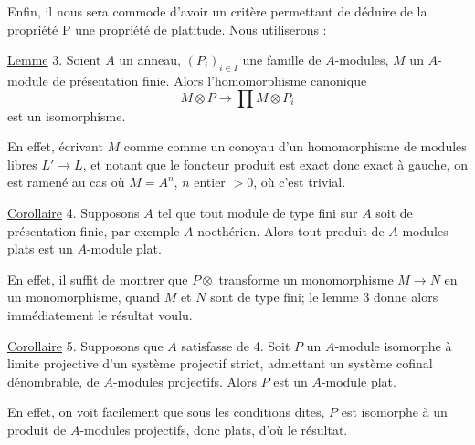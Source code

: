 
Enfin, il nous sera commode d'avoir un critère permettant de déduire
de la propriété P une propriété de platitude. Nous utiliserons :

\uline{Lemme} 3. Soient $A$ un anneau, $(P_i)_{i\in I}$ une famille de $A$-modules,
 $M$ un $A$-module de présentation finie. Alors l'homomorphisme canonique
\[
M\otimes P\longrightarrow\prod M\otimes P_i
\]
est un isomorphisme.

En effet, écrivant $M$ comme comme un conoyau d'un homomorphisme
de modules libres  $L'\longrightarrow L$, et notant que le foncteur produit est exact
donc exact à gauche, on est ramené au cas où $M=A^n$, $n$ entier $>0$, où
c'est trivial.

\uline{Corollaire} 4. Supposons $A$ tel que tout module de type fini sur $A$ soit
de présentation finie, par exemple $A$ noethérien. Alors tout produit de
$A$-modules plats est un $A$-module plat.

En effet, il suffit de montrer que $P\otimes$ transforme un monomorphisme
$M\longrightarrow N$ en un monomorphisme, quand $M$ et $N$ sont de type fini; le lemme 3 donne
alors immédiatement le résultat voulu.

\uline{Corollaire} 5. Supposons que $A$ satisfasse 
 de 4.  Soit
$P$ un $A$-module  isomorphe à  limite projective
d'un système projectif strict, 
admettant un système cofinal dénombrable, de $A$-modules projectifs. Alors
$P$ est un $A$-module plat.

En effet, on voit facilement que sous les conditions dites, $P$ est
isomorphe à un produit de $A$-modules projectifs, donc plats, d'où le résultat.

